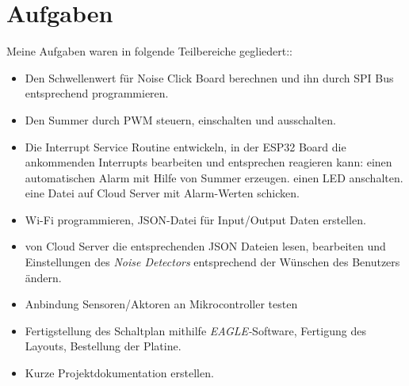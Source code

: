 \section{Aufgaben}
Meine Aufgaben waren in folgende Teilbereiche gegliedert:: 
\begin{itemize}
	\item Den Schwellenwert für Noise Click Board berechnen und ihn durch SPI Bus entsprechend programmieren. 
	\item Den Summer durch PWM steuern, einschalten und ausschalten.{\normalsize }
	\item Die Interrupt Service Routine entwickeln, in der ESP32 Board die ankommenden Interrupts bearbeiten und entsprechen reagieren kann:
	\subitem * einen automatischen Alarm mit Hilfe von Summer erzeugen.
	\subitem * einen LED anschalten.
	\subitem * eine Datei auf Cloud Server mit Alarm-Werten schicken.
	\item Wi-Fi  programmieren, JSON-Datei für Input/Output Daten erstellen.
	\item von Cloud Server die entsprechenden JSON Dateien lesen, bearbeiten und Einstellungen des \textit{Noise Detectors} entsprechend der Wünschen des Benutzers ändern.
	\item Anbindung Sensoren/Aktoren an Mikrocontroller testen
	\item Fertigstellung des Schaltplan mithilfe \textit{EAGLE-}Software, Fertigung des Layouts, Bestellung der Platine.
	\item Kurze Projektdokumentation erstellen.	
\end{itemize}